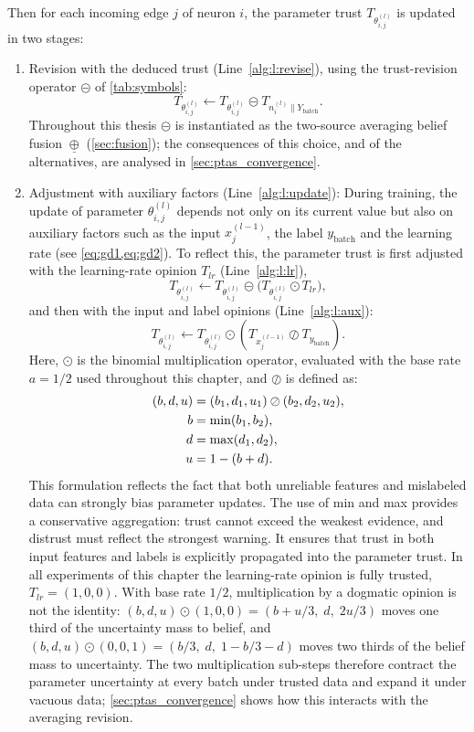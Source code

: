 Then for each incoming edge \( j\) of neuron \( i \), the parameter trust \( T_{\theta_{i,j}^{(l)}} \) is updated in two stages:
\begin{enumerate}
    \item Revision with the deduced trust (Line~\ref{alg:l:revise}), using the trust-revision operator $\circleddash$ of \cref{tab:symbols}:
    \[
    T_{\theta_{i,j}^{(l)}} \leftarrow T_{\theta_{i,j}^{(l)}} \circleddash T_{n_{i}^{(l)} \parallel Y_\text{batch}} .
    \]
    Throughout this thesis $\circleddash$ is instantiated as the two-source averaging belief fusion $\underline{\oplus}$ (\cref{sec:fusion}); the consequences of this choice, and of the alternatives, are analysed in \cref{sec:ptas_convergence}.
    \item Adjustment with auxiliary factors (Line~\ref{alg:l:update}):
    During training, the update of parameter $\theta_{i,j}^{(l)}$ depends not only on its current value but also on auxiliary factors such as the input $x^{(l-1)}_{j}$, the label $y_\text{batch}$ and the learning rate (see \cref{eq:gd1,eq:gd2}).
To reflect this, the parameter trust is first adjusted with the learning-rate opinion $T_{lr}$ (Line~\ref{alg:l:lr}),
\[
    T_{\theta_{i,j}^{(l)}} \longleftarrow T_{\theta_{i,j}^{(l)}} \circleddash \big(T_{\theta_{i,j}^{(l)}} \odot T_{lr}\big),
\]
and then with the input and label opinions (Line~\ref{alg:l:aux}):
\[
    T_{\theta_{i,j}^{(l)}} \longleftarrow T_{\theta_{i,j}^{(l)}} \odot (T_{x_j^{(l-1)}} \oslash T_{y_\text{batch}}).
\]
Here, $\odot$ is the binomial multiplication operator, evaluated with the base rate $a = 1/2$ used throughout this chapter, and $\oslash$ is defined as:
\begin{align}
    (b,d,u) &= (b_1, d_1, u_1) \oslash (b_2, d_2, u_2), \\
    b &= \min(b_1, b_2), \notag \\
    d &= \max(d_1, d_2), \notag \\
    u &= 1 - (b+d). \notag
\end{align}
This formulation reflects the fact that both unreliable features and mislabeled data can strongly bias parameter updates. The use of min and max provides a conservative aggregation: trust cannot exceed the weakest evidence, and distrust must reflect the strongest warning. It ensures that trust in both input features and labels is explicitly propagated into the parameter trust. In all experiments of this chapter the learning-rate opinion is fully trusted, $T_{lr} = (1,0,0)$. With base rate $1/2$, multiplication by a dogmatic opinion is not the identity: $(b,d,u) \odot (1,0,0) = (b + u/3,\; d,\; 2u/3)$ moves one third of the uncertainty mass to belief, and $(b,d,u) \odot (0,0,1) = (b/3,\; d,\; 1 - b/3 - d)$ moves two thirds of the belief mass to uncertainty. The two multiplication sub-steps therefore contract the parameter uncertainty at every batch under trusted data and expand it under vacuous data; \cref{sec:ptas_convergence} shows how this interacts with the averaging revision.
\end{enumerate}


